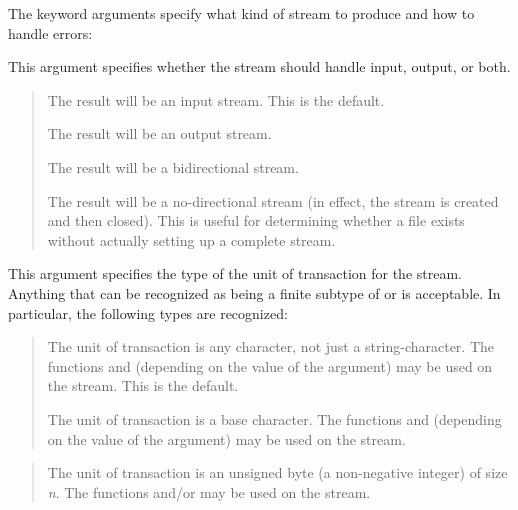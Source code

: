 \begin{defun}[Function]
The keyword arguments specify what kind of stream to produce and how
to handle errors:
\begin{flushdesc}
\item[\cd{:direction}]
This argument specifies whether the stream should handle input, output,
or both.
\begin{quotation}
\begin{flushdesc}
\item[\cd{:input}]
The result will be an input stream.  This is the default.

\item[\cd{:output}]
The result will be an output stream.

\item[\cd{:io}]
The result will be a bidirectional stream.

\item[\cd{:probe}]
The result will be a no-directional stream (in effect, the stream
is created and then closed).  This is useful for determining whether
a file exists without actually setting up a complete stream.
\end{flushdesc}
\end{quotation}

\item[\cd{:element-type}]
This argument specifies the type of the unit of transaction for the stream.
Anything that can be recognized as being a finite subtype of
 or  is acceptable.  In particular,
the following types are recognized:

\begin{quotation}
\begin{flushdesc}
\item[\cdf{character}]
The unit of transaction is any character, not just a string-character.
The functions  and  (depending on the value of the
 argument) may be used on the stream.  This is the default.

\item[\cdf{base-char}]
The unit of transaction is a base character.
The functions  and  (depending on the value of the
 argument) may be used on the stream.
\end{flushdesc}
\end{quotation}

\begin{quotation}
\begin{flushdesc}
\item[\cd{(unsigned-byte \emph{n})}]
The unit of transaction is an unsigned byte (a non-negative integer) of size \emph{n}.
The functions  and/or  may be
used on the stream.


\end{flushdesc}
\end{quotation}
\end{flushdesc}
\end{defun}
